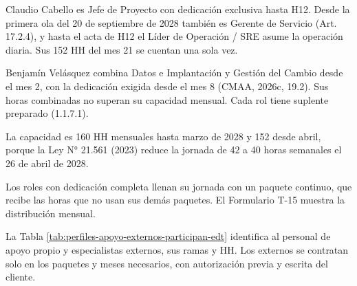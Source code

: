 \documentclass[formulario]{../../comun/overfore}
\begin{document}
Claudio Cabello es Jefe de Proyecto con dedicación exclusiva hasta H12. Desde la primera ola del 20 de septiembre de 2028 también es Gerente de Servicio (Art. 17.2.4), y hasta el acta de H12 el Líder de Operación / SRE asume la operación diaria. Sus 152 HH del mes 21 se cuentan una sola vez.

Benjamín Velásquez combina Datos e Implantación y Gestión del Cambio desde el mes 2, con la dedicación exigida desde el mes 8 (CMAA, 2026c, 19.2). Sus horas combinadas no superan su capacidad mensual. Cada rol tiene suplente preparado (1.1.7.1).

La capacidad es 160 HH mensuales hasta marzo de 2028 y 152 desde abril, porque la Ley N° 21.561 (2023) reduce la jornada de 42 a 40 horas semanales el 26 de abril de 2028.

Los roles con dedicación completa llenan su jornada con un paquete continuo, que recibe las horas que no usan sus demás paquetes. El Formulario T-15 muestra la distribución mensual.

La Tabla \ref{tab:perfiles-apoyo-externos-participan-edt} identifica al personal de apoyo propio y especialistas externos, sus ramas y HH. Los externos se contratan solo en los paquetes y meses necesarios, con autorización previa y escrita del cliente.
\end{document}
